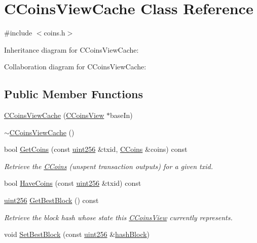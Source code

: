 \hypertarget{class_c_coins_view_cache}{}\section{C\+Coins\+View\+Cache Class Reference}
\label{class_c_coins_view_cache}


{\ttfamily \#include $<$coins.\+h$>$}



Inheritance diagram for C\+Coins\+View\+Cache\+:


Collaboration diagram for C\+Coins\+View\+Cache\+:
\subsection*{Public Member Functions}
\begin{DoxyCompactItemize}
\item 
\hyperlink{class_c_coins_view_cache_a515a6f259af607fb3394b560d9c063c9}{C\+Coins\+View\+Cache} (\hyperlink{class_c_coins_view}{C\+Coins\+View} $\ast$base\+In)
\item 
\hyperlink{class_c_coins_view_cache_a6148421cb7605fb434f6c8622f39430b}{$\sim$\+C\+Coins\+View\+Cache} ()
\item 
bool \hyperlink{class_c_coins_view_cache_a27ec8311ae409ea1e3c3484c1d4a9035}{Get\+Coins} (const \hyperlink{classuint256}{uint256} \&txid, \hyperlink{class_c_coins}{C\+Coins} \&coins) const 
\begin{DoxyCompactList}\small\item\em Retrieve the \hyperlink{class_c_coins}{C\+Coins} (unspent transaction outputs) for a given txid. \end{DoxyCompactList}\item 
bool \hyperlink{class_c_coins_view_cache_a25dddabe8734fc9823112763494da72b}{Have\+Coins} (const \hyperlink{classuint256}{uint256} \&txid) const 
\item 
\hyperlink{classuint256}{uint256} \hyperlink{class_c_coins_view_cache_aabcd1da9f28445e09c9af5f68ce7f100}{Get\+Best\+Block} () const 
\begin{DoxyCompactList}\small\item\em Retrieve the block hash whose state this \hyperlink{class_c_coins_view}{C\+Coins\+View} currently represents. \end{DoxyCompactList}\item 
void \hyperlink{class_c_coins_view_cache_aa3f787f77b123f0fd340fbe4e458b4ad}{Set\+Best\+Block} (const \hyperlink{classuint256}{uint256} \&\hyperlink{class_c_coins_view_cache_a229dddddbc5501edc250209a2ce5df8b}{hash\+Block})

\end{DoxyCompactItemize}
